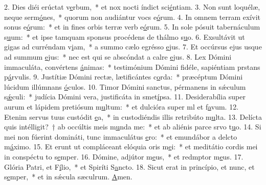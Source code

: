 2. Dies diéi erúctat v\uline{e}rbum,~* et nox nocti índict sci\uline{é}ntiam.
3. Non sunt loquélæ, neque serm\uline{ó}nes,~* quorum non audiántur vocs e\uline{ó}rum.
4. In omnem terram exívit sonus e\uline{ó}rum:~* et in fines orbis terræ verb e\uline{ó}rum.
5. In sole pósuit tabernáculum s\uline{u}um:~* et ipse tamquam sponsus procédens de thálmo s\uline{u}o.
6. Exsultávit ut gigas ad curréndam v\uline{i}am,~* a summo cælo egrésso \uline{e}jus.
7. Et occúrsus ejus usque ad summum \uline{e}jus:~* nec est qui se abscóndat a calre \uline{e}jus.
8. Lex Dómini immaculáta, convértens \uline{á}nimas:~* testimónium Dómini fidéle, sapiéntiam prstans p\uline{á}rvulis.
9. Justítiæ Dómini rectæ, lætificántes c\uline{o}rda:~* præcéptum Dómini lúcidum illúmnans \uline{ó}culos.
10. Timor Dómini sanctus, pérmanens in sǽculum s\uline{ǽ}culi:~* judícia Dómini vera, justificáta in smet\uline{í}psa.
11. Desiderabília super aurum et lápidem pretiósum m\uline{u}ltum:~* et dulcióra super ml et f\uline{a}vum.
12. Etenim servus tuus custódit \uline{e}a,~* in custodiéndis illis retribúto m\uline{u}lta.
13. Delícta quis intélligit?~† ab occúltis meis m\uline{u}nda me:~* et ab aliénis parce srvo t\uline{u}o.
14. Si mei non fúerint domináti, tunc immaculátus \uline{e}ro:~* et emundábor a delcto m\uline{á}ximo.
15. Et erunt ut compláceant elóquia oris m\uline{e}i:~* et meditátio cordis mei in conspéctu to s\uline{e}mper.
16. Dómine, adjútor m\uline{e}us,~* et redmptor m\uline{e}us.
17. Glória Patri, et F\uline{í}lio,~* et Spiríti S\uline{a}ncto.
18. Sicut erat in princípio, et nunc, et s\uline{e}mper,~* et in sǽcula sæculrum. \uline{A}men.
